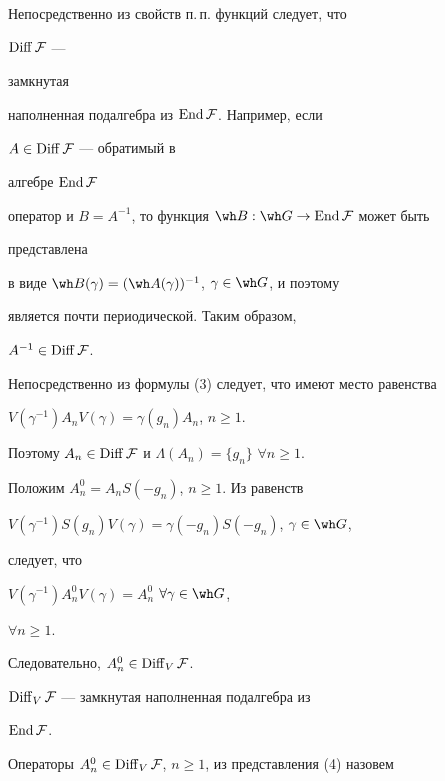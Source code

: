 \begin{pf} Непосредственно из свойств п.\,п. функций следует, что 


$\operatorname{Diff}\cal F$ --- 


замкнутая 


наполненная подалгебра из $\operatorname{End}\cal F$. Например, если 


$A\in\operatorname{Diff}\cal F$ --- обратимый в 


алгебре $\operatorname{End}\cal F$ 


оператор и $B=A^{-1}$, то функция $\wh B:\wh G\to\End\cal F$ может быть 


представлена 


в виде $\wh B(\gamma)=(\wh A(\gamma))^{-1}$, $\gamma\in\wh G$, и поэтому 


является почти периодической. Таким образом, 


$A^{-1}\in\operatorname{Diff}\cal F$. 


 


Непосредственно из формулы (3) следует, что имеют место равенства 


$V(\gamma^{-1})A_nV(\gamma)=\gamma(g_n)A_n$, $n\ge 1$. 


Поэтому $A_n\in\operatorname{Diff}\cal F$ и $\Lambda(A_n)=\{g_n\}$ $\forall n\ge 1$. 


 


Положим $A_n^0=A_nS(-g_n)$, $n\ge 1$. Из равенств 


$V(\gamma^{-1})S(g_n)V(\gamma)=\gamma(-g_n)S(-g_n)$, $\gamma\in\wh G$, 


следует, что 


$V(\gamma^{-1})A^0_nV(\gamma)=A^0_n$ $\forall\gamma\in\wh G$, 


$\forall n\ge 1$. 


Следовательно, $A^0_n\in\operatorname{Diff}_V\cal F$. 


\end{pf} 


 


\begin{cornonum} $\operatorname{Diff}_V\cal F$ --- замкнутая наполненная подалгебра из 


$\operatorname{End}\cal F$. 


\end{cornonum} 


 


Операторы $A^0_n\in\operatorname{Diff}_V\cal F$, $n\ge 1$, из представления (4) назовем 


